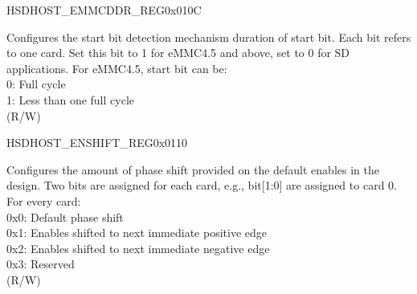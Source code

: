 \begin{register}{H}{SDHOST\_EMMCDDR\_REG}{0x010C}\label{regdesc:SDHOSTEMMCDDRREG}
%
%
\regnewline%
\begin{regdesc}\begin{reglist}
\label{fielddesc:SDHOSTHALFSTARTBITREG}\item [SDHOST\_HALFSTARTBIT\_REG] Configures the start bit detection mechanism duration of start bit. Each bit refers to one card. Set this bit to 1 for eMMC4.5 and above, set to 0 for SD applications. For eMMC4.5, start bit can be:\\
0: Full cycle\\
1: Less than one full cycle\\(R/W)
\end{reglist}\end{regdesc}
\end{register}


\begin{register}{H}{SDHOST\_ENSHIFT\_REG}{0x0110}\label{regdesc:SDHOSTENSHIFTREG}
%
%
\regnewline%
\begin{regdesc}\begin{reglist}
\label{fielddesc:SDHOSTENABLESHIFTREG}\item [SDHOST\_ENABLE\_SHIFT\_REG] Configures the amount of phase shift provided on the default enables in the design. Two bits are assigned for each card, e.g., bit[1:0] are assigned to card 0. For every card:\\
0x0: Default phase shift\\
0x1: Enables shifted to next immediate positive edge\\
0x2: Enables shifted to next immediate negative edge\\
0x3: Reserved\\(R/W)
\end{reglist}\end{regdesc}
\end{register}


